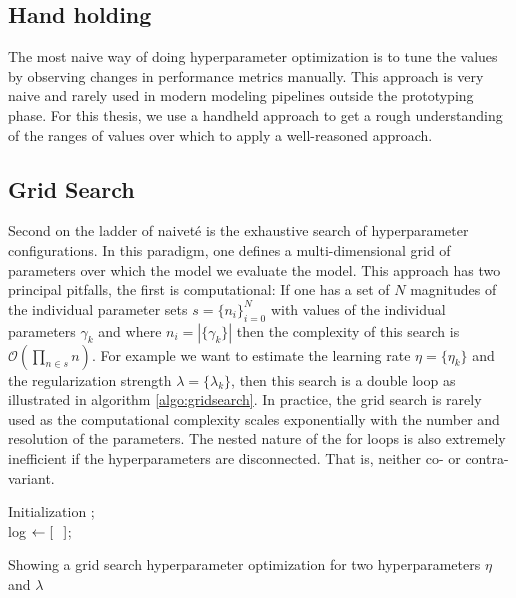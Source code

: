 \subsection{Hand holding}
The most naive way of doing hyperparameter optimization is to tune the values by observing changes in performance metrics manually. This approach is very naive and rarely used in modern modeling pipelines outside the prototyping phase. For this thesis, we use a handheld approach to get a rough understanding of the ranges of values over which to apply a well-reasoned approach. 

\subsection{Grid Search}
Second on the ladder of naiveté is the exhaustive search of hyperparameter configurations. In this paradigm, one defines a multi-dimensional grid of parameters over which the model we evaluate the model. This approach has two principal pitfalls, the first is computational: If one has a set of $N$ magnitudes of the individual parameter sets $s = \{n_i\}_{i=0}^{N}$ with values of the individual parameters $\gamma_k$ and where $n_i = |\{\gamma_k\}|$ then the complexity of this search is $\mathcal{O}(\prod_{n \in s} n)$. For example we want to estimate the learning rate $\eta = \{\eta_k\}$ and the regularization strength $\lambda = \{\lambda_k\}$, then this search is a double loop as illustrated in algorithm \ref{algo:gridsearch}. In practice, the grid search is rarely used as the computational complexity scales exponentially with the number and resolution of the parameters. The nested nature of the for loops is also extremely inefficient if the hyperparameters are disconnected.  That is, neither co- or contra-variant.  

\begin{algorithm}[H]
\SetAlgoLined
{}
Initialization ;\\
log $\leftarrow [\hspace{0.1in}]$;\\
\caption{Showing a grid search hyperparameter optimization for two hyperparameters $\eta$ and $\lambda$}\label{algo:gridsearch}
\end{algorithm}

